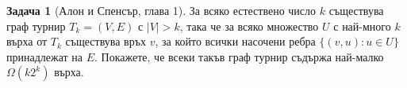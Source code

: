 \documentclass[11 pt, a4paper]{article}
\theoremstyle{definition}
\newtheorem{p}{Задача}
\theoremstyle{remark}
\newtheorem*{s}{Решение}
\begin{document}
\begin{p}[Алон и Спенсър, глава 1]
За всяко естествено число $k$ съществува граф турнир $T_k=(V,E)$ с $|V|>k$, така че за всяко множество $U$ с най-много $k$ върха от $T_k$ съществува връх $v$, за който всички насочени ребра $\big\{(v,u):u\in U\big\}$ принадлежат на $E$. Покажете, че всеки такъв граф турнир съдържа най-малко $\Omega(k2^k)$ върха.
\end{p}
\end{document}
